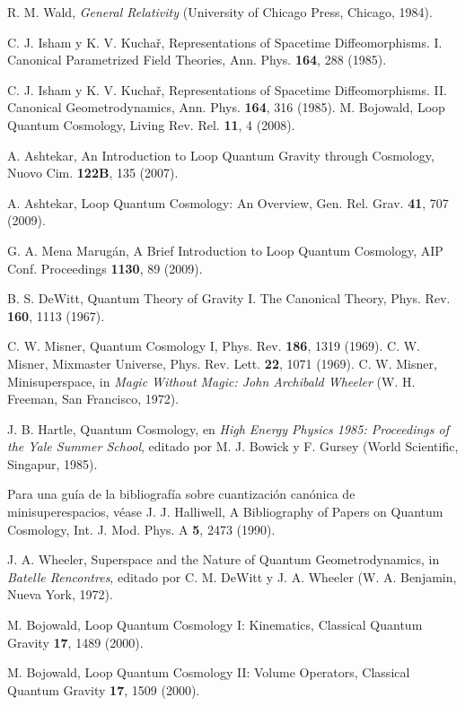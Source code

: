 \begin{thebibliography}{999}
 R. M. Wald, {\it General Relativity} (University of Chicago Press, Chicago, 1984).

 C. J. Isham y K. V. Kucha\v{r}, Representations of Spacetime Diffeomorphisms. I.
Canonical Parametrized Field Theories, Ann. Phys. {\bf164}, 288 (1985).

 C. J. Isham y K. V. Kucha\v{r}, Representations of Spacetime Diffeomorphisms. II.
Canonical Geometrodynamics, Ann. Phys. {\bf164}, 316 (1985).
 M. Bojowald, Loop Quantum Cosmology, Living Rev. Rel. {\bf 11}, 4 (2008).

 A. Ashtekar, An Introduction to Loop Quantum Gravity through
Cosmology, Nuovo Cim. {\bf122B}, 135 (2007).

 A. Ashtekar, Loop Quantum Cosmology: An Overview,
Gen. Rel. Grav. {\bf41}, 707 (2009).

 G. A. Mena Marug\'an, A Brief Introduction to Loop Quantum Cosmology, AIP Conf.
Proceedings {\bf 1130}, 89 (2009).

 B. S. DeWitt, Quantum Theory of Gravity I. The Canonical Theory, Phys. Rev.
{\bf160}, 1113 (1967).

 C. W. Misner, Quantum Cosmology I, Phys. Rev. {\bf 186}, 1319 (1969).
 C. W. Misner, Mixmaster Universe, Phys. Rev. Lett. {\bf22}, 1071 (1969).
 C. W. Misner, Minisuperspace, in {\it Magic Without Magic: John Archibald Wheeler}
(W. H. Freeman, San Francisco, 1972).

 J. B. Hartle, Quantum Cosmology, en {\it High Energy Physics 1985: Proceedings of
the Yale Summer School}, editado por M. J. Bowick y F. Gursey (World Scientific, Singapur, 1985).

 Para una guía de la bibliografía sobre cuantización canónica de minisuperespacios,
véase J. J. Halliwell, A Bibliography of Papers on Quantum Cosmology, Int. J. Mod. Phys. A {\bf5},
2473 (1990).

 J. A. Wheeler, Superspace and the Nature of Quantum Geometrodynamics, in {\it Batelle
Rencontres}, editado por C. M. DeWitt y J. A. Wheeler (W. A. Benjamin, Nueva York, 1972).

 M. Bojowald, Loop Quantum Cosmology I: Kinematics, Classical Quantum Gravity
{\bf17}, 1489 (2000).

 M. Bojowald, Loop Quantum Cosmology II: Volume Operators, Classical Quantum Gravity
{\bf17}, 1509 (2000).


\end{thebibliography}
